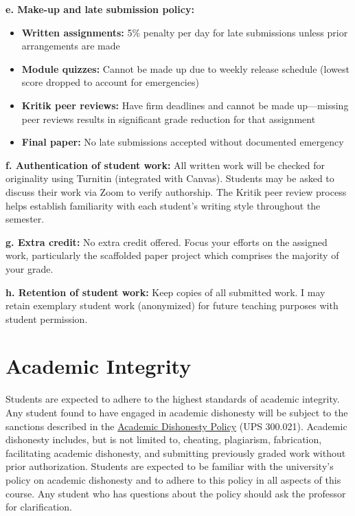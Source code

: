 \documentclass[12pt]{article}     %
\begin{document}
\vspace{1em}
\noindent \textbf{e. Make-up and late submission policy:}
\begin{itemize}
\item \textbf{Written assignments:} 5\% penalty per day for late submissions unless prior arrangements are made
\item \textbf{Module quizzes:} Cannot be made up due to weekly release schedule (lowest score dropped to account for emergencies)
\item \textbf{Kritik peer reviews:} Have firm deadlines and cannot be made up---missing peer reviews results in significant grade reduction for that assignment
\item \textbf{Final paper:} No late submissions accepted without documented emergency
\end{itemize}

\vspace{1em}
\noindent \textbf{f. Authentication of student work:}
All written work will be checked for originality using Turnitin (integrated with Canvas). Students may be asked to discuss their work via Zoom to verify authorship. The Kritik peer review process helps establish familiarity with each student's writing style throughout the semester.

\vspace{1em}
\noindent \textbf{g. Extra credit:}
No extra credit offered. Focus your efforts on the assigned work, particularly the scaffolded paper project which comprises the majority of your grade.

\vspace{1em}
\noindent \textbf{h. Retention of student work:}
Keep copies of all submitted work. I may retain exemplary student work (anonymized) for future teaching purposes with student permission.

\section{Academic Integrity}
Students are expected to adhere to the highest standards of academic integrity. Any student found to have engaged in academic dishonesty will be subject to the sanctions described in the \href{https://www.fullerton.edu/senate/publications_policies_resolutions/ups/UPS%20300/UPS%20300.021.pdf}{Academic Dishonesty Policy} (UPS 300.021). Academic dishonesty includes, but is not limited to, cheating, plagiarism, fabrication, facilitating academic dishonesty, and submitting previously graded work without prior authorization. Students are expected to be familiar with the university's policy on academic dishonesty and to adhere to this policy in all aspects of this course. Any student who has questions about the policy should ask the professor for clarification.
\end{document}
